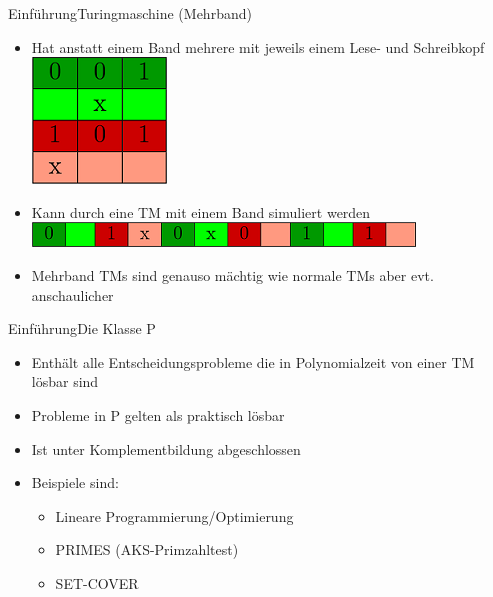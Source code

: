 \documentclass[ignorenonframetext,]{beamer}
\begin{document}
\begin{frame}{Einführung}{Turingmaschine (Mehrband)}

\begin{itemize}
\itemsep1pt\parskip0pt
\item
  Hat anstatt einem Band mehrere mit jeweils einem Lese- und
  Schreibkopf\\\includegraphics{img/TM1.png}
\item
  Kann durch eine TM mit einem Band simuliert
  werden\\\includegraphics{img/TM2.png}
\item
  Mehrband TMs sind genauso mächtig wie normale TMs aber evt.
  anschaulicher
\end{itemize}

\end{frame}

\begin{frame}{Einführung}{Die Klasse P}

\begin{itemize}
\itemsep1pt\parskip0pt
\item
  Enthält alle Entscheidungsprobleme die in Polynomialzeit von einer TM
  lösbar sind
\item
  Probleme in P gelten als praktisch lösbar
\item
  Ist unter Komplementbildung abgeschlossen
\item
  Beispiele sind:

  \begin{itemize}
  \itemsep1pt\parskip0pt
  \item
    Lineare Programmierung/Optimierung
  \item
    PRIMES (AKS-Primzahltest)
  \item
    SET-COVER
  \end{itemize}
\end{itemize}

\end{frame}
\end{document}
